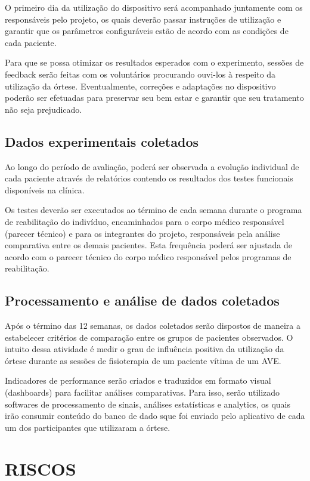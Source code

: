 \documentclass[rascunho,xindy]{fei}
\begin{document}
O primeiro dia da utilização do dispositivo será acompanhado juntamente com os responsáveis pelo projeto, os quais deverão passar instruções de utilização e garantir que os parâmetros configuráveis estão de acordo com as condições de cada paciente.

Para que se possa otimizar os resultados esperados com o experimento, sessões de feedback serão feitas com os voluntários procurando ouvi-los à respeito da utilização da órtese. Eventualmente, correções e adaptações no dispositivo poderão ser efetuadas para preservar seu bem estar e garantir que seu tratamento não seja prejudicado.


\section{Dados experimentais coletados}

Ao longo do período de avaliação, poderá ser observada a evolução individual de cada paciente através de relatórios contendo os resultados dos testes funcionais disponíveis na clínica.

Os testes deverão ser executados ao término de cada semana durante o programa de reabilitação do indivíduo, encaminhados para o corpo médico responsável (parecer técnico) e para os integrantes do projeto, responsáveis pela análise comparativa entre os demais pacientes. Esta frequência poderá ser ajustada de acordo com o parecer técnico do corpo médico responsável pelos programas de reabilitação.


\section{Processamento e análise de dados coletados}

Após o término das 12 semanas, os dados coletados serão dispostos de maneira a estabelecer critérios de comparação entre os grupos de pacientes observados. O intuito dessa atividade é medir o grau de influência positiva da utilização da órtese durante as sessões de fisioterapia de um paciente vítima de um AVE.

Indicadores de performance serão criados e traduzidos em formato visual (dashboards) para facilitar análises comparativas. Para isso, serão utilizado softwares de processamento de sinais, análises estatísticas e analytics, os quais irão consumir conteúdo do banco de dado sque foi enviado pelo aplicativo de cada um dos participantes que utilizaram a órtese.


\chapter{RISCOS}
\end{document}
